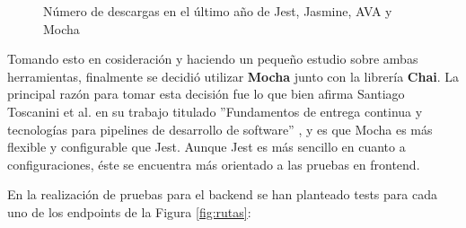 \begin{figure}[H]
    \caption{Número de descargas en el último año de Jest, Jasmine, AVA y Mocha}
    \label{fig:tests-stats}
\end{figure}

Tomando esto en cosideración y haciendo un pequeño estudio sobre ambas herramientas, finalmente se decidió utilizar \textbf{Mocha} junto con la librería \textbf{Chai}. La principal razón para tomar esta decisión fue lo que bien afirma Santiago Toscanini et al. en su trabajo titulado ''Fundamentos de entrega continua y tecnologías para pipelines de
desarrollo de software'' \cite{toscanini2022fundamentos}, y es que Mocha es más flexible y configurable que Jest. Aunque Jest es más sencillo en cuanto a configuraciones, éste se encuentra más orientado a las pruebas en frontend. \bigskip

En la realización de pruebas para el backend se han planteado tests para cada uno de los endpoints de la Figura \ref{fig:rutas}:

